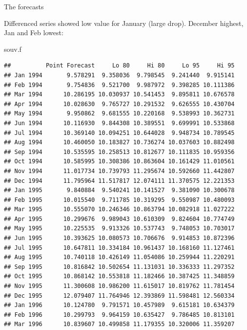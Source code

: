 \documentclass[
  ignorenonframetext,
]{beamer}
\newenvironment{Shaded}{\begin{snugshade}}{\end{snugshade}}
\newcommand{\NormalTok}[1]{#1}
\begin{document}
\begin{frame}[fragile]{The forecasts}
\protect\hypertarget{the-forecasts}{}

Differenced series showed low value for January (large drop). December
highest, Jan and Feb lowest:

\scriptsize

\begin{Shaded}
\begin{Highlighting}[]
\NormalTok{souv.f}
\end{Highlighting}
\end{Shaded}

\begin{verbatim}
##          Point Forecast     Lo 80     Hi 80     Lo 95     Hi 95
## Jan 1994       9.578291  9.358036  9.798545  9.241440  9.915141
## Feb 1994       9.754836  9.521700  9.987972  9.398285 10.111386
## Mar 1994      10.286195 10.030937 10.541453  9.895811 10.676578
## Apr 1994      10.028630  9.765727 10.291532  9.626555 10.430704
## May 1994       9.950862  9.681555 10.220168  9.538993 10.362731
## Jun 1994      10.116930  9.844308 10.389551  9.699991 10.533868
## Jul 1994      10.369140 10.094251 10.644028  9.948734 10.789545
## Aug 1994      10.460050 10.183827 10.736274 10.037603 10.882498
## Sep 1994      10.535595 10.258513 10.812677 10.111835 10.959356
## Oct 1994      10.585995 10.308386 10.863604 10.161429 11.010561
## Nov 1994      11.017734 10.739793 11.295674 10.592660 11.442807
## Dec 1994      11.795964 11.517817 12.074111 11.370575 12.221353
## Jan 1995       9.840884  9.540241 10.141527  9.381090 10.300678
## Feb 1995      10.015540  9.711785 10.319295  9.550987 10.480093
## Mar 1995      10.555070 10.246346 10.863794 10.082918 11.027222
## Apr 1995      10.299676  9.989043 10.610309  9.824604 10.774749
## May 1995      10.225535  9.913326 10.537743  9.748053 10.703017
## Jun 1995      10.393625 10.080573 10.706676  9.914853 10.872396
## Jul 1995      10.647811 10.334184 10.961437 10.168160 11.127461
## Aug 1995      10.740118 10.426149 11.054086 10.259944 11.220291
## Sep 1995      10.816842 10.502654 11.131031 10.336333 11.297352
## Oct 1995      10.868142 10.553818 11.182466 10.387425 11.348859
## Nov 1995      11.300608 10.986200 11.615017 10.819762 11.781454
## Dec 1995      12.079407 11.764946 12.393869 11.598481 12.560334
## Jan 1996      10.124780  9.791571 10.457989  9.615181 10.634379
## Feb 1996      10.299793  9.964159 10.635427  9.786485 10.813101
## Mar 1996      10.839607 10.499858 11.179355 10.320006 11.359207
\end{verbatim}


\end{frame}
\end{document}
